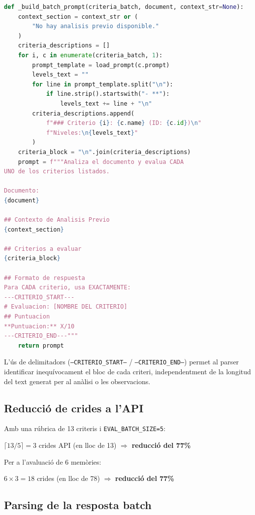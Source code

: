 \documentclass[12pt,a4paper,twoside]{report}
\begin{document}
\begin{lstlisting}[language=Python]
def _build_batch_prompt(criteria_batch, document, context_str=None):
    context_section = context_str or (
        "No hay analisis previo disponible."
    )
    criteria_descriptions = []
    for i, c in enumerate(criteria_batch, 1):
        prompt_template = load_prompt(c.prompt)
        levels_text = ""
        for line in prompt_template.split("\n"):
            if line.strip().startswith("- **"):
                levels_text += line + "\n"
        criteria_descriptions.append(
            f"### Criterio {i}: {c.name} (ID: {c.id})\n"
            f"Niveles:\n{levels_text}"
        )
    criteria_block = "\n".join(criteria_descriptions)
    prompt = f"""Analiza el documento y evalua CADA
UNO de los criterios listados.

Documento:
{document}

## Contexto de Analisis Previo
{context_section}

## Criterios a evaluar
{criteria_block}

## Formato de respuesta
Para CADA criterio, usa EXACTAMENTE:
---CRITERIO_START---
# Evaluacion: [NOMBRE DEL CRITERIO]
## Puntuacion
**Puntuacion:** X/10
---CRITERIO_END---"""
    return prompt
\end{lstlisting}

L'\'us de delimitadors (\texttt{---CRITERIO\_START---} / \texttt{---CRITERIO\_END---}) permet al parser identificar inequ\'ivocament el bloc de cada criteri, independentment de la longitud del text generat per al an\`alisi o les observacions.

\subsection{Reducci\'o de crides a l'API}

Amb una r\'ubrica de 13 criteris i \texttt{EVAL\_BATCH\_SIZE=5}:

\begin{center}
$\lceil 13 / 5 \rceil = 3$ crides API (en lloc de 13) $\Rightarrow$ \textbf{reducci\'o del 77\%}
\end{center}

Per a l'avaluaci\'o de 6 mem\`ories:

\begin{center}
$6 \times 3 = 18$ crides (en lloc de 78) $\Rightarrow$ \textbf{reducci\'o del 77\%}
\end{center}

\subsection{Parsing de la resposta batch}
\end{document}
